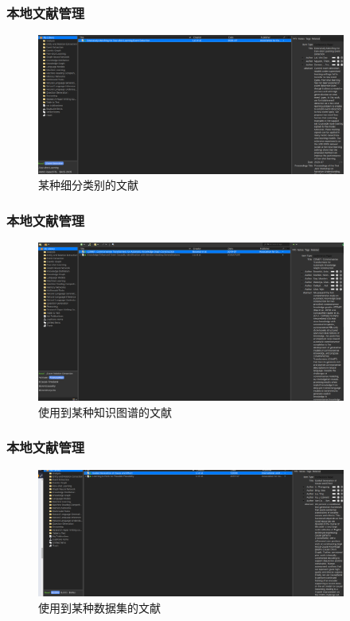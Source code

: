 \documentclass[10pt,aspectratio=43,mathserif]{beamer}
\begin{document}
		\begin{frame}
		  \frametitle{\textbf{本地文献管理}}
            \begin{figure}[!t]
            \centering
            \includegraphics[width=4in]{figures/category.png}
            \caption{某种细分类别的文献}
            \label{fig:category}
            \end{figure}
		\end{frame}

		\begin{frame}
		  \frametitle{\textbf{本地文献管理}}
            \begin{figure}[!t]
            \centering
            \includegraphics[width=4in]{figures/kg2.png}
            \caption{使用到某种知识图谱的文献}
            \label{fig:kg2}
            \end{figure}
		\end{frame}
		
		\begin{frame}
		  \frametitle{\textbf{本地文献管理}}
            \begin{figure}[!t]
            \centering
            \includegraphics[width=4in]{figures/dataset.png}
            \caption{使用到某种数据集的文献}
            \label{fig:dataset}
            \end{figure}
		\end{frame}
\end{document}
